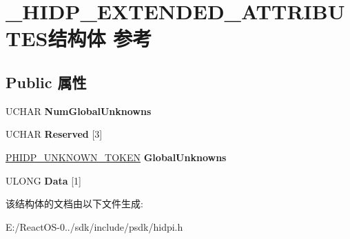 \hypertarget{struct___h_i_d_p___e_x_t_e_n_d_e_d___a_t_t_r_i_b_u_t_e_s}{}\section{\+\_\+\+H\+I\+D\+P\+\_\+\+E\+X\+T\+E\+N\+D\+E\+D\+\_\+\+A\+T\+T\+R\+I\+B\+U\+T\+E\+S结构体 参考}
\label{struct___h_i_d_p___e_x_t_e_n_d_e_d___a_t_t_r_i_b_u_t_e_s}
\subsection*{Public 属性}
\begin{DoxyCompactItemize}
\item 
\mbox{\label{struct___h_i_d_p___e_x_t_e_n_d_e_d___a_t_t_r_i_b_u_t_e_s_a556bdb28d474700555f732d6e3b6bf43}} 
U\+C\+H\+AR {\bfseries Num\+Global\+Unknowns}
\item 
\mbox{\label{struct___h_i_d_p___e_x_t_e_n_d_e_d___a_t_t_r_i_b_u_t_e_s_a6a3cf4d1382b728b314e0f7b863c7960}} 
U\+C\+H\+AR {\bfseries Reserved} \mbox{[}3\mbox{]}
\item 
\mbox{\label{struct___h_i_d_p___e_x_t_e_n_d_e_d___a_t_t_r_i_b_u_t_e_s_a533a8e7ed8087b330018f46e33748c61}} 
\hyperlink{struct___h_i_d_p___u_n_k_n_o_w_n___t_o_k_e_n}{P\+H\+I\+D\+P\+\_\+\+U\+N\+K\+N\+O\+W\+N\+\_\+\+T\+O\+K\+EN} {\bfseries Global\+Unknowns}
\item 
\mbox{\label{struct___h_i_d_p___e_x_t_e_n_d_e_d___a_t_t_r_i_b_u_t_e_s_a5a0c4689f63ed61de18db59de429bbb3}} 
U\+L\+O\+NG {\bfseries Data} \mbox{[}1\mbox{]}
\end{DoxyCompactItemize}


该结构体的文档由以下文件生成\+:\begin{DoxyCompactItemize}
\item 
E\+:/\+React\+O\+S-\/0../sdk/include/psdk/hidpi.\+h\end{DoxyCompactItemize}
